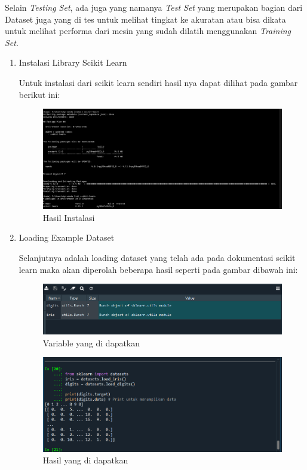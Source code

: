 \documentclass{report}
\begin{document}
\vspace{0.4cm}
\hangindent=0.5cm Selain \emph{Testing Set}, ada juga yang namanya \emph{Test Set} yang merupakan bagian dari Dataset juga yang di tes untuk melihat tingkat ke akuratan atau bisa dikata untuk melihat performa dari mesin yang sudah dilatih menggunakan \emph{Training Set}.

\vspace{0.4cm}



\begin{enumerate}
   \item Instalasi Library Scikit Learn
   
	\hangindent=0.5cm Untuk instalasi dari scikit learn sendiri hasil nya dapat dilihat pada gambar berikut ini:
	
\begin{figure}[hbtp]
\caption{Hasil Instalasi}
\centering
\includegraphics[scale=0.3]{../figures/1.png}
\end{figure}

	
   \item Loading Example Dataset
   
   	\hangindent=0.5cm Selanjutnya adalah loading dataset yang telah ada pada dokumentasi scikit learn maka akan diperolah beberapa hasil seperti pada gambar dibawah ini:
   	
   	\begin{figure}[hbtp]
   	\caption{Variable yang di dapatkan}
   	\centering
   	\includegraphics[scale=0.6]{../figures/Praktikum 1.png}
   	\end{figure}
   	
   \begin{figure}[hbtp]
   \caption{Hasil yang di dapatkan}
   \centering
   \includegraphics[scale=0.5]{../figures/Praktikum 2.png}
   \end{figure}
   

\end{enumerate}
\end{document}
